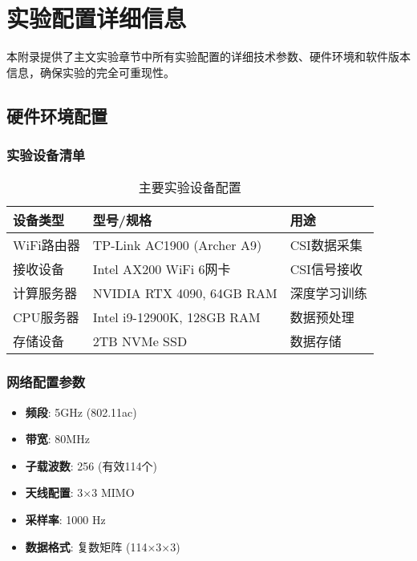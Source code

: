 \chapter{实验配置详细信息}
\label{app:experiment_details}

本附录提供了主文实验章节中所有实验配置的详细技术参数、硬件环境和软件版本信息，确保实验的完全可重现性。

\section{硬件环境配置}
\label{app:hardware_config}

\subsection{实验设备清单}
\label{app:hardware_list}

\begin{table}[h]
\centering
\caption{主要实验设备配置}
\label{tab:hardware_specs}
\begin{tabular}{lll}
\toprule
\textbf{设备类型} & \textbf{型号/规格} & \textbf{用途} \\
\midrule
WiFi路由器 & TP-Link AC1900 (Archer A9) & CSI数据采集 \\
接收设备 & Intel AX200 WiFi 6网卡 & CSI信号接收 \\
计算服务器 & NVIDIA RTX 4090, 64GB RAM & 深度学习训练 \\
CPU服务器 & Intel i9-12900K, 128GB RAM & 数据预处理 \\
存储设备 & 2TB NVMe SSD & 数据存储 \\
\bottomrule
\end{tabular}
\end{table}

\subsection{网络配置参数}
\label{app:network_params}

\begin{itemize}
\item \textbf{频段}: 5GHz (802.11ac)
\item \textbf{带宽}: 80MHz  
\item \textbf{子载波数}: 256 (有效114个)
\item \textbf{天线配置}: 3×3 MIMO
\item \textbf{采样率}: 1000 Hz
\item \textbf{数据格式}: 复数矩阵 (114×3×3)
\end{itemize}

